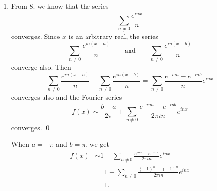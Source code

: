 \documentclass[oneside]{article}
\begin{document}
\begin{enumerate}[label=(\alph*)]
  \item From 8. we know that the series \[
    \sum_{n\neq0}\frac{e^{inx}}{n}
  \] converges. Since $x$ is an arbitrary real, the series \[
    \sum_{n\neq0}\frac{e^{in(x-a)}}{n}\qquad\text{and}\qquad
    \sum_{n\neq0}\frac{e^{in(x-b)}}{n}
  \] converge also. Then \[
    \sum_{n\neq0}\frac{e^{in(x-a)}}{n} - \sum_{n\neq0}\frac{e^{in(x-b)}}{n}
    = \sum_{n\neq0}\frac{e^{-ina}-e^{-inb}}{n}e^{inx}
  \] converges also and the Fourier series \[
    f(x) \sim \frac{b-a}{2\pi}
    + \sum_{n\neq0}\frac{e^{-ina}-e^{-inb}}{2\pi i n}e^{inx}
  \] converges. \qed

  When $a = -\pi$ and $b = \pi$, we get\begin{align*}
    f(x) &\sim 1 + \sum_{n\neq0}\frac{e^{in\pi}-e^{-in\pi}}{2\pi i n}e^{inx} \\
    &= 1 + \sum_{n\neq0}\frac{(-1)^n-(-1)^n}{2\pi i n}e^{inx} \\
    &= 1\text{.}
  \end{align*}
  \end{enumerate}
\end{document}
